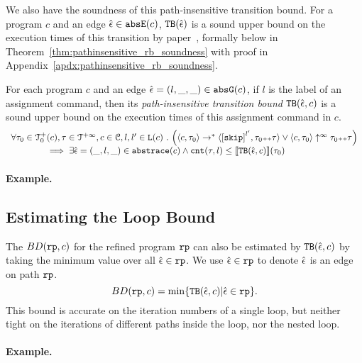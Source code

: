 We also have the soundness of this path-insensitive transition bound. For a program $c$ and an edge $\hat{\mathtt{\epsilon}{}} \in \mathtt{abs}{\mathtt{E}}(c)$,
${\mathtt{TB}}(\hat{\mathtt{\epsilon}{}})$ is a sound upper bound
on the execution times of this transition by paper~\cite{SinnZV17}, formally below in Theorem~\ref{thm:pathinsensitive_rb_soundness} with proof in Appendix~\ref{apdx:pathinsensitive_rb_soundness}.
%
\begin{thm}
  \label{thm:pathinsensitive_rb_soundness}
For each program ${c}$ and an edge $\hat{\mathtt{\epsilon}{}} = (l, \_, \_) \in \mathtt{abs}{\mathtt{G}}(c)$, if $l$ is the label of an assignment command,
then its \emph{path-insensitive transition bound} ${\mathtt{TB}}(\hat{\mathtt{\epsilon}{}}, c)$ 
 is a sound upper bound on 
the execution times of this assignment command in $c$.
  \[
    \begin{array}{l}
      \forall \trace_0 \in \ftdom_0(c), \trace \in \tdom, c \in \cdom, l, l' \in \lvar(c) \st
      \Big( \config{c, \trace_0} \rightarrow^{*} \config{\clabel{\eskip}^{l'}, \trace_0 \tracecat \trace} 
        \lor  \config{c, \trace_0} \uparrow^{\infty} \trace_0 \tracecat \trace \Big)
       \\ \qquad \qquad
       \implies
       \exists \absevent = (\_, l, \_) \in \absflow(c) \land
      \counter(\trace, l) \leq \econfig{\absclr(\absevent, c)}(\trace_0)
    \end{array}
  \]
\end{thm}
%
\paragraph[example]{Example.}

\subsection{Estimating the Loop Bound} 
The $BD(\mathtt{rp}, c)$ for the refined program $\mathtt{rp}$ can also be estimated by ${\mathtt{TB}}(\hat{\mathtt{\epsilon}{}}, c)$ by taking the
minimum value over all $\hat{\mathtt{\epsilon}{}} \in \mathtt{rp}$.
We use $\hat{\mathtt{\epsilon}{}} \in \mathtt{rp}$ to denote $\hat{\mathtt{\epsilon}{}}$ is an edge on path $\mathtt{rp}$.
\begin{equation}
  \label{eq:absBD}
  BD(\rprog, c) = \min\left\{ \absclr(\absevent, c) \middle\vert \absevent \in \rprog \right\}.
\end{equation}
%
This bound is accurate on the iteration numbers of a single loop, but neither tight on the iterations of different paths inside the loop, nor the nested loop.
%
\paragraph[example]{Example.}
